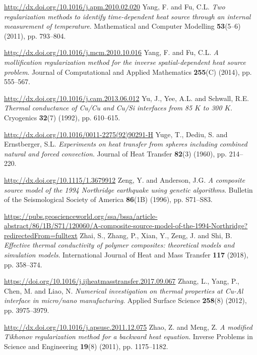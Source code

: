 \begin{thebibliography}{301}
\url{http://dx.doi.org/10.1016/j.apm.2010.02.020}
%
%
 Yang, F. and Fu, C.L. {\it Two regularization methods to identify time-dependent heat source through an internal measurement of temperature}. Mathematical and Computer Modelling {\bf 53}(5--6) (2011), pp. 793--804.

\url{http://dx.doi.org/10.1016/j.mcm.2010.10.016} 
%
%
 Yang, F. and Fu, C.L. {\it A mollification regularization method for the inverse spatial-dependent heat source problem}. Journal of Computational and Applied Mathematics {\bf 255}(C) (2014), pp. 555--567.

\url{http://dx.doi.org/10.1016/j.cam.2013.06.012}
%
%
 Yu, J., Yee, A.L. and Schwall, R.E. {\it Thermal conductance of Cu/Cu and Cu/Si interfaces from 85 $K$ to 300 $K$}. Cryogenics {\bf 32}(7) (1992), pp. 610--615.

\url{http://dx.doi.org/10.1016/0011-2275(92)90291-H}
%
%
 Yuge, T., Dediu, S. and Ernstberger, S.L. {\it Experiments on heat transfer from spheres including combined natural and forced convection}. Journal of Heat Transfer {\bf 82}(3) (1960), pp. 214--220.

\url{http://dx.doi.org/10.1115/1.3679912}
%
%
 Zeng, Y. and Anderson, J.G. {\it A composite source model of the 1994 Northridge earthquake using genetic algorithms}. Bulletin of the Seismological Society of America {\bf 86}(1B) (1996), pp. S71--S83.

\url{https://pubs.geoscienceworld.org/ssa/bssa/article-abstract/86/1B/S71/120060/A-composite-source-model-of-the-1994-Northridge?redirectedFrom=fulltext}
%
%
 Zhai, S., Zhang, P., Xian, Y., Zeng, J. and Shi, B. {\it Effective thermal conductivity of polymer composites: theoretical models and simulation models}. International Journal of Heat and Mass Transfer {\bf 117} (2018), pp. 358--374.

\url{https://doi.org/10.1016/j.ijheatmasstransfer.2017.09.067}
%
%
 Zhang, L., Yang, P., Chen, M. and Liao, N. {\it Numerical investigation on thermal properties at Cu-Al interface in micro/nano manufacturing}. Applied Surface Science {\bf 258}(8) (2012), pp. 3975--3979.

\url{http://dx.doi.org/10.1016/j.apsusc.2011.12.075}
%
%
 Zhao, Z. and Meng, Z. {\it A modified Tikhonov regularization method for a backward heat equation}. Inverse Problems in Science and Engineering {\bf 19}(8) (2011), pp. 1175--1182.


\end{thebibliography}
